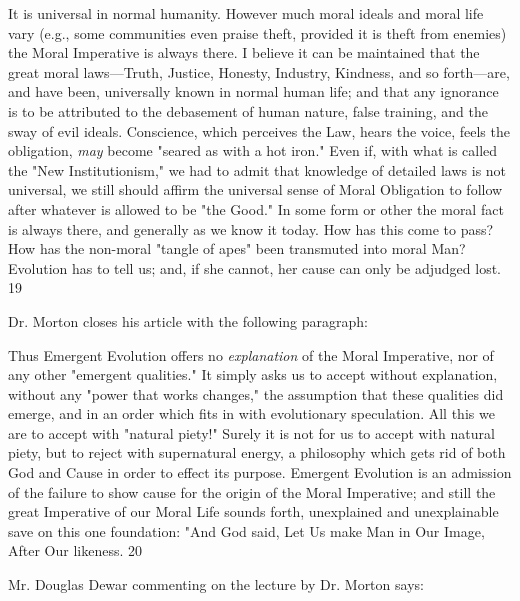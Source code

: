 It is universal in normal humanity. However much moral ideals and moral life vary (e.g.,
some communities even praise theft, provided it is theft from enemies) the Moral Imperative
is always there. I believe it can be maintained that the great moral laws—Truth, Justice,
Honesty, Industry, Kindness, and so forth—are, and have been, universally known in normal
human life; and that any ignorance is to be attributed to the debasement of human nature,
false training, and the sway of evil ideals. Conscience, which perceives the Law, hears the
voice, feels the obligation, \textit{may} become "seared as with a hot iron." Even if, with what is
called the "New Institutionism," we had to admit that knowledge of detailed laws is not
universal, we still should affirm the universal sense of Moral Obligation to follow after
whatever is allowed to be "the Good." In some form or other the moral fact is always there,
and generally as we know it today. How has this come to pass? How has the non-moral
"tangle of apes" been transmuted into moral Man? Evolution has to tell us; and, if she cannot,
her cause can only be adjudged lost. 19

Dr. Morton closes his article with the following paragraph:

Thus Emergent Evolution offers no \textit{explanation} of the Moral Imperative, nor of any other
"emergent qualities." It simply asks us to accept without explanation, without any "power
that works changes," the assumption that these qualities did emerge, and in an order which
fits in with evolutionary speculation. All this we are to accept with "natural piety!" Surely it
is not for us to accept with natural piety, but to reject with supernatural energy, a philosophy
which gets rid of both God and Cause in order to effect its purpose. Emergent Evolution is an
admission of the failure to show cause for the origin of the Moral Imperative; and still the
great Imperative of our Moral Life sounds forth, unexplained and unexplainable save on this
one foundation: "And God said, Let Us make Man in Our Image, After Our likeness. 20

Mr. Douglas Dewar commenting on the lecture by Dr. Morton says:

